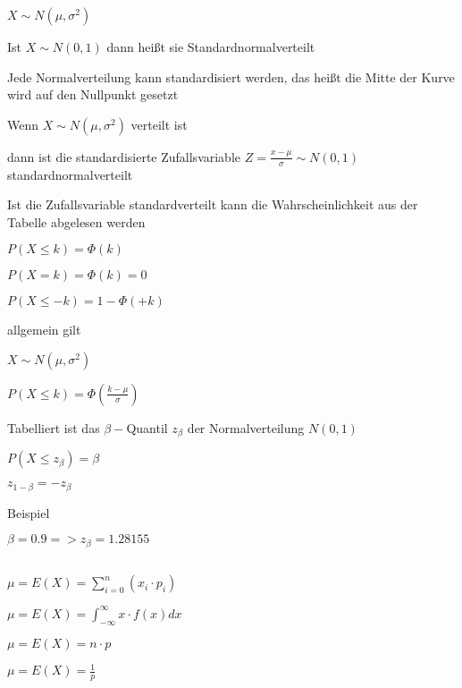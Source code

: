 \documentclass[10pt,a4paper,landscape]{article}
\begin{document}
\begin{multicols*}{4}
\parbox{\columnwidth}{\centering $X \sim N(\mu, \sigma^2)$}
\parbox{\columnwidth}{\centering Ist $X \sim N(0, 1)$ dann heißt sie Standardnormalverteilt}
\parbox{\columnwidth}{\centering Jede Normalverteilung kann standardisiert werden, das heißt die Mitte der Kurve wird auf den Nullpunkt gesetzt}
\parbox{\columnwidth}{\centering Wenn $X \sim N(\mu, \sigma^2)$ verteilt ist}
\parbox{\columnwidth}{\centering dann ist die standardisierte Zufallsvariable $Z = \frac{x-\mu}{\sigma} \sim N(0,1)$ standardnormalverteilt}
\parbox{\columnwidth}{\centering Ist die Zufallsvariable standardverteilt kann die Wahrscheinlichkeit aus der Tabelle abgelesen werden}
\parbox{\columnwidth}{\centering $P(X \leq k) = \Phi(k)$}
\parbox{\columnwidth}{\centering $P(X = k) = \Phi(k) = 0$}
\parbox{\columnwidth}{\centering $P(X \leq -k) = 1 - \Phi(+k)$}
\parbox{\columnwidth}{\centering allgemein gilt}
\parbox{\columnwidth}{\centering $X \sim N (\mu, \sigma^2)$}
\parbox{\columnwidth}{\centering $P(X \leq k) = \Phi(\frac{k-\mu}{\sigma})$}

\parbox{\columnwidth}{\centering Tabelliert ist das $\beta-$Quantil $z_\beta$ der Normalverteilung $N(0,1)$}
\parbox{\columnwidth}{\centering $P(X \leq z_\beta) = \beta$}
\parbox{\columnwidth}{\centering $z_{1-\beta} = -z_\beta$}
\parbox{\columnwidth}{\centering Beispiel}
\parbox{\columnwidth}{\centering $\beta = 0.9 => z_\beta = 1.28155$}

\subsection{}
\subsubsection{}

\parbox{\columnwidth}{\centering $\mu = E(X) = \sum \limits_{i=0}^n (x_i \cdot p_i)$}

\parbox{\columnwidth}{\centering $\mu = E(X) = \int_{-\infty}^{\infty} x \cdot f(x) dx $}

\parbox{\columnwidth}{\centering $\mu = E(X) = n \cdot p$}

\parbox{\columnwidth}{\centering $\mu = E(X) = \frac{1}{p}$}


\end{multicols*}
\end{document}
